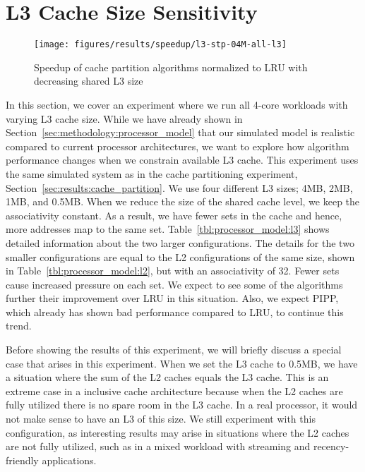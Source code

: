 \section{L3 Cache Size Sensitivity}
\label{sec:results:l3size_sensitivity}


\begin{figure}[th]
    \centering
    \texttt{[image: figures/results/speedup/l3-stp-04M-all-l3]}
    \caption[Speedup wtih decreasing L3 size]{Speedup of cache partition algorithms normalized to LRU with decreasing shared L3 size}
    \label{fig:results:l3}
\end{figure}

In this section, we cover an experiment where we run all 4-core workloads with varying L3 cache size.
While we have already shown in Section~\ref{sec:methodology:processor_model} that our simulated model is realistic compared to current processor architectures, we want to explore how algorithm performance changes when we constrain available L3 cache.
This experiment uses the same simulated system as in the cache partitioning experiment, Section~\ref{sec:results:cache_partition}.
We use four different L3 sizes; 4MB, 2MB, 1MB, and 0.5MB.
When we reduce the size of the shared cache level, we keep the associativity constant.
As a result, we have fewer sets in the cache and hence, more addresses map to the same set.
Table~\ref{tbl:processor_model:l3} shows detailed information about the two larger configurations.
The details for the two smaller configurations are equal to the L2 configurations of the same size, shown in Table~\ref{tbl:processor_model:l2}, but with an associativity of 32.
Fewer sets cause increased pressure on each set.
We expect to see some of the algorithms further their improvement over LRU in this situation.
Also, we expect PIPP, which already has shown bad performance compared to LRU, to continue this trend.

Before showing the results of this experiment, we will briefly discuss a special case that arises in this experiment.
When we set the L3 cache to 0.5MB, we have a situation where the sum of the L2 caches equals the L3 cache.
This is an extreme case in a inclusive cache architecture because when the L2 caches are fully utilized there is no spare room in the L3 cache.
In a real processor, it would not make sense to have an L3 of this size.
We still experiment with this configuration, as interesting results may arise in situations where the L2 caches are not fully utilized, such as in a mixed workload with streaming and recency-friendly applications.

